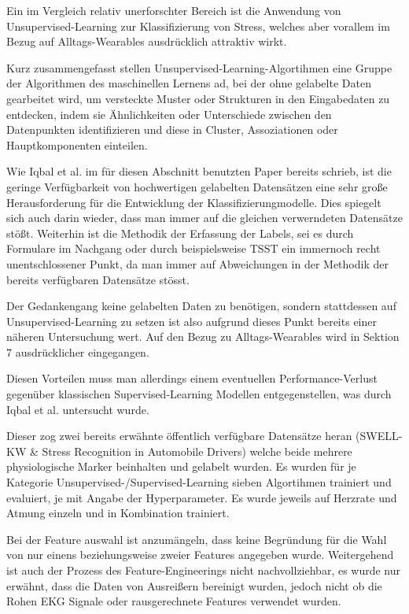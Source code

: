 Ein im Vergleich relativ unerforschter Bereich ist die Anwendung von Unsupervised-Learning zur Klassifizierung von Stress, welches aber vorallem im Bezug auf Alltags-Wearables ausdrücklich attraktiv wirkt.

Kurz zusammengefasst stellen Unsupervised-Learning-Algortihmen eine Gruppe der Algorithmen des maschinellen Lernens ad, bei der ohne gelabelte Daten gearbeitet wird, 
um versteckte Muster oder Strukturen in den Eingabedaten zu entdecken, indem sie Ähnlichkeiten oder Unterschiede zwischen den Datenpunkten identifizieren und diese in Cluster, Assoziationen oder Hauptkomponenten 
einteilen.

Wie Iqbal et al. im für diesen Abschnitt benutzten Paper \cite{Iqbal2022} bereits schrieb, ist die geringe Verfügbarkeit von hochwertigen gelabelten Datensätzen eine sehr große Herausforderung
für die Entwicklung der Klassifizierungmodelle. Dies spiegelt sich auch darin wieder, dass man immer auf die gleichen verwerndeten Datensätze stößt. Weiterhin ist die Methodik der Erfassung der Labels, sei es durch Formulare im Nachgang oder durch beispielsweise \ac{TSST}
ein immernoch recht unentschlossener Punkt, da man immer auf Abweichungen in der Methodik der bereits verfügbaren Datensätze stösst.

Der Gedankengang keine gelabelten Daten zu benötigen, sondern stattdessen auf Unsupervised-Learning zu setzen ist also aufgrund dieses Punkt bereits einer näheren Untersuchung wert. Auf den Bezug zu Alltags-Wearables wird in Sektion 
7 ausdrücklicher eingegangen.

Diesen Vorteilen muss man allerdings einem eventuellen Performance-Verlust gegenüber klassischen Supervised-Learning Modellen 
entgegenstellen, was durch Iqbal et al. untersucht wurde.

Dieser zog zwei bereits erwähnte öffentlich verfügbare Datensätze heran (SWELL-KW \& Stress Recognition in Automobile Drivers) welche beide mehrere physiologische Marker beinhalten und gelabelt wurden.
Es wurden für je Kategorie Unsupervised-/Supervised-Learning sieben Algortihmen trainiert und evaluiert, je mit Angabe der Hyperparameter. Es wurde jeweils auf Herzrate und Atmung einzeln und in Kombination trainiert.

Bei der Feature auswahl ist anzumängeln, dass keine Begründung für die Wahl von nur einens beziehungsweise zweier Features angegeben wurde. Weitergehend ist auch der Prozess des Feature-Engineerings nicht
nachvollziehbar, es wurde nur erwähnt, dass die Daten von Ausreißern bereinigt wurden, jedoch nicht ob die Rohen \ac{EKG} Signale oder rausgerechnete Features verwendet wurden.

